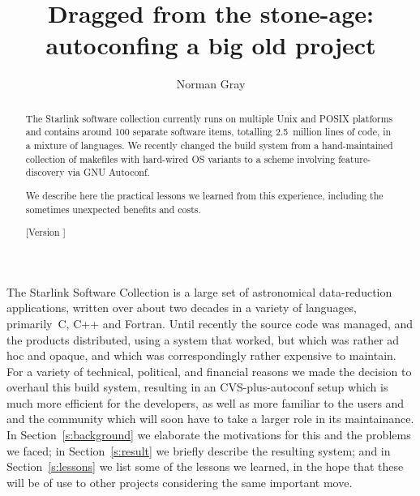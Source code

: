 \documentclass{speauth}
\begin{document}


\title{Dragged from the stone-age: autoconfing a big old project}

\author{Norman Gray\footnotemark}

\noreceived{}
\norevised{}
\noaccepted{}



\begin{abstract}
The Starlink software collection currently runs on multiple
Unix and POSIX platforms and contains around 100 separate software items,
totalling 2.5~million lines of code, in a mixture of languages.  We
recently changed the build system from a hand-maintained collection of
makefiles with hard-wired OS variants to a scheme involving
feature-discovery via GNU Autoconf.

We describe here the practical lessons we learned from this
experience, including the sometimes unexpected benefits and costs.

[Version \RCSRevision]
\end{abstract}



The Starlink Software Collection \cite{draper05} is a large set of
astronomical data-reduction 
applications, written over about two decades in a variety of
languages, primarily~C, C++ and Fortran.  Until recently the source
code was managed, and the
products distributed, using a system that worked, but which was
rather ad hoc and opaque, and which was correspondingly rather
expensive to maintain.  For a variety of technical, political, and financial
reasons we made the decision to overhaul this build system, resulting
in an CVS-plus-autoconf setup which is much more efficient for the
developers, as well as more familiar to the users and and the
community which will soon have to take a larger role in its maintainance.
In Section~\ref{s:background} we elaborate the 
motivations for this and the problems we faced; in
Section~\ref{s:result} we briefly describe the resulting system; and
in Section~\ref{s:lessons} we list some of the lessons we learned, in
the hope that these will be of use to other projects considering the
same important move.
\end{document}
